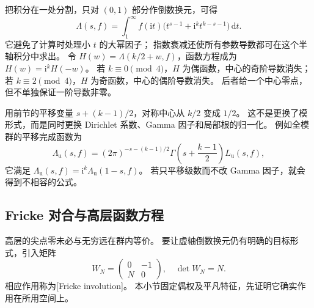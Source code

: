 把积分在一处分割，只对 \((0,1)\) 部分作倒数换元，可得
\begin{equation}\label{b3:eq:E-split-mellin}
 \Lambda(s,f)=\int_1^\infty f(\mathrm i t)
          \bigl(t^{s-1}+\mathrm i^k t^{k-s-1}\bigr)\,\mathrm dt.
\end{equation}
它避免了计算时处理小 \(t\) 的大幂因子；
指数衰减还使所有参数导数都可在这个半轴积分中求出。
令 \(H(w)=\Lambda(k/2+w,f)\)，函数方程成为
\(H(w)=\mathrm i^kH(-w)\)。
若 \(k\equiv0\pmod4\)，\(H\) 为偶函数，中心的奇阶导数消失；
若 \(k\equiv2\pmod4\)，\(H\) 为奇函数，中心的偶阶导数消失。
后者给一个中心零点，但不单独保证一阶导数非零。

\ProseParagraphBreak

用前节的平移变量 \(s+(k-1)/2\)，对称中心从 \(k/2\) 变成 \(1/2\)。
这不是更换了模形式，而是同时更换 Dirichlet 系数、Gamma 因子和局部根的归一化。
例如全模群的平移完成函数为
\[
 \Lambda_{\mathrm u}(s,f)
 =(2\pi)^{-s-(k-1)/2}\Gamma\left(s+\frac{k-1}2\right)L_{\mathrm u}(s,f),
\]
它满足 \(\Lambda_{\mathrm u}(s,f)=\mathrm i^k\Lambda_{\mathrm u}(1-s,f)\)。
若只平移级数而不改 Gamma 因子，就会得到不相容的公式。

\subsection{Fricke 对合与高层函数方程}
\label{b3:subsec:E0403}

高层的尖点零未必与无穷远在群内等价。
要让虚轴倒数换元仍有明确的目标形式，引入矩阵
\[
 W_N=\begin{pmatrix}0&-1\\N&0\end{pmatrix},\quad \det W_N=N.
\]
相应作用称为[Fricke involution]。
本小节固定偶权及平凡特征，先证明它确实作用在所用空间上。

